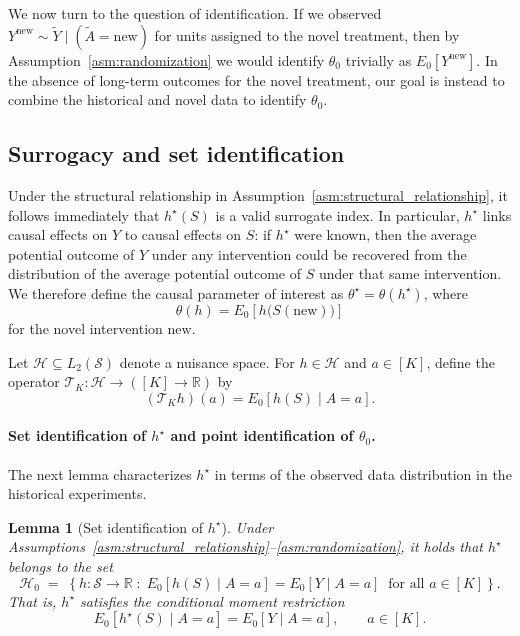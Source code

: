 \documentclass[11pt]{article}
\newcommand{\new}{\mathrm{new}}
\theoremstyle{plain}
\newtheorem{lemma}{Lemma}
\theoremstyle{definition}
\theoremstyle{remark}
\theoremstyle{definition}
\begin{document}
\medskip

We now turn to the question of identification.  
If we observed $Y^{\new} \sim \widetilde Y \mid (\widetilde A = \new)$ for units assigned to the novel treatment, then by Assumption~\ref{asm:randomization} we would identify $\theta_0$ trivially as $E_0[Y^{\new}]$. In the absence of long-term outcomes for the novel treatment, our goal is instead to combine the historical and novel data to identify $\theta_0$.

\subsection{Surrogacy and set identification}

Under the structural relationship in Assumption~\ref{asm:structural_relationship}, it follows immediately that $h^\star(S)$ is a valid surrogate index. In particular, $h^\star$ links causal effects on $Y$ to causal effects on $S$: if $h^\star$ were known, then the average potential outcome of $Y$ under any intervention could be recovered from the distribution of the average potential outcome of $S$ under that same intervention. We therefore define the causal parameter of interest as $\theta^\star = \theta(h^\star)$, where
\[
\theta(h) = E_0\!\left[h\big(S(\new)\big)\right]
\]
for the novel intervention $\new$.

Let $\mathcal{H} \subseteq L_2(\mathcal{S})$ denote a nuisance space. For $h \in \mathcal{H}$ and $a \in [K]$, define the operator $\mathcal{T}_K : \mathcal{H} \to ([K] \to \mathbb{R})$ by
\[
(\mathcal{T}_K h)(a) = E_0[h(S)\mid A=a].
\]

\paragraph{Set identification of $h^\star$ and point identification of $\theta_0$.}

The next lemma characterizes $h^\star$ in terms of the observed data distribution in the historical experiments.

\begin{lemma}[Set identification of $h^\star$]\label{lemma:set_id_h_star}
Under Assumptions~\ref{asm:structural_relationship}--\ref{asm:randomization}, it holds that $h^\star$ belongs to the set
\[
\mathcal{H}_0 \;=\; 
\left\{h : \mathcal{S}\to\mathbb{R} \;:\; 
E_0\!\left[h(S)\mid A=a\right] = E_0\!\left[Y\mid A=a\right]\;\; \text{for all } a\in[K]\right\}.
\]
That is, $h^\star$ satisfies the conditional moment restriction
\[
E_0\!\left[h^\star(S)\mid A=a\right] = E_0\!\left[Y\mid A=a\right],\qquad a\in[K].
\]
\end{lemma}
\end{document}
